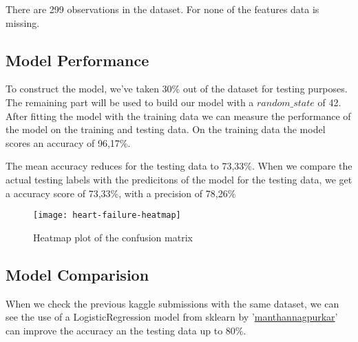 \noindent There are 299 observations in the dataset. For none of the features data is missing.

\subsection{Model Performance}

To construct the model, we've taken 30\% out of the dataset for testing purposes. The remaining part will be used to build our model with a $random\_state$ of 42. After fitting the model with the training data we can measure the performance of the model on the training and testing data. On the training data the model scores an accuracy of 96,17\%.

The mean accuracy reduces for the testing data to 73,33\%. When we compare the actual testing labels with the predicitons of the model for the testing data, we get a accuracy score of 73,33\%, with a precision of 78,26\%

\begin{figure}[t]
  \begin{center}
    \texttt{[image: heart-failure-heatmap]}
    \caption{Heatmap plot of the confusion matrix}
  \end{center}
\end{figure}


\subsection{Model Comparision}

When we check the previous kaggle submissions with the same dataset, we can see the use of a LogisticRegression model from sklearn by '\href{https://www.kaggle.com/manthannagpurkar/heart-failure-prediction}{manthannagpurkar}' can improve the accuracy an the testing data up to 80\%.


